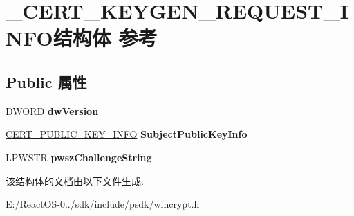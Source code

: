 \hypertarget{struct___c_e_r_t___k_e_y_g_e_n___r_e_q_u_e_s_t___i_n_f_o}{}\section{\+\_\+\+C\+E\+R\+T\+\_\+\+K\+E\+Y\+G\+E\+N\+\_\+\+R\+E\+Q\+U\+E\+S\+T\+\_\+\+I\+N\+F\+O结构体 参考}
\label{struct___c_e_r_t___k_e_y_g_e_n___r_e_q_u_e_s_t___i_n_f_o}
\subsection*{Public 属性}
\begin{DoxyCompactItemize}
\item 
\mbox{\label{struct___c_e_r_t___k_e_y_g_e_n___r_e_q_u_e_s_t___i_n_f_o_a68c9143dcac8630800bdb2838cd706f5}} 
D\+W\+O\+RD {\bfseries dw\+Version}
\item 
\mbox{\label{struct___c_e_r_t___k_e_y_g_e_n___r_e_q_u_e_s_t___i_n_f_o_a19b1d5ce95aa77482252f14dc28dab0e}} 
\hyperlink{struct___c_e_r_t___p_u_b_l_i_c___k_e_y___i_n_f_o}{C\+E\+R\+T\+\_\+\+P\+U\+B\+L\+I\+C\+\_\+\+K\+E\+Y\+\_\+\+I\+N\+FO} {\bfseries Subject\+Public\+Key\+Info}
\item 
\mbox{\label{struct___c_e_r_t___k_e_y_g_e_n___r_e_q_u_e_s_t___i_n_f_o_a3f80878a0828b84230b6610a551880f2}} 
L\+P\+W\+S\+TR {\bfseries pwsz\+Challenge\+String}
\end{DoxyCompactItemize}


该结构体的文档由以下文件生成\+:\begin{DoxyCompactItemize}
\item 
E\+:/\+React\+O\+S-\/0../sdk/include/psdk/wincrypt.\+h\end{DoxyCompactItemize}
